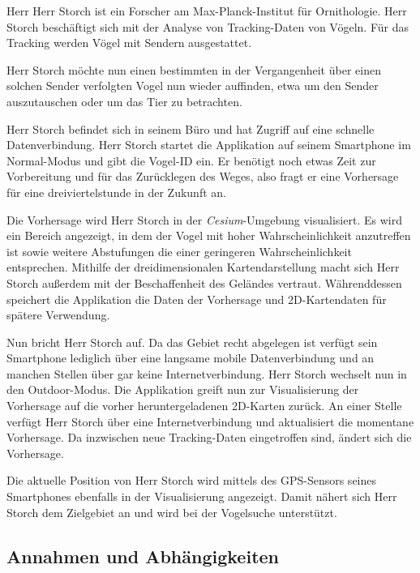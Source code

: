 \documentclass[12pt]{article} %
\begin{document}
\begin{displayquote}
\small
Herr Herr Storch ist ein Forscher am Max-Planck-Institut für Ornithologie. Herr Storch beschäftigt sich mit der Analyse von Tracking-Daten von Vögeln. Für das Tracking werden Vögel mit Sendern ausgestattet. 

Herr Storch möchte nun einen bestimmten in der Vergangenheit über einen solchen Sender verfolgten Vogel nun wieder auffinden, etwa um den Sender auszutauschen oder um das Tier zu betrachten.

Herr Storch befindet sich in seinem Büro und hat Zugriff auf eine schnelle Datenverbindung. Herr Storch startet die Applikation auf seinem Smartphone im Normal-Modus und gibt die Vogel-ID ein. Er benötigt noch etwas Zeit zur Vorbereitung und für das Zurücklegen des Weges, also fragt er eine Vorhersage für eine dreiviertelstunde in der Zukunft an.

Die Vorhersage wird Herr Storch in der \textit{Cesium}-Umgebung visualisiert. Es wird ein Bereich angezeigt, in dem der Vogel mit hoher Wahrscheinlichkeit anzutreffen ist sowie weitere Abstufungen die einer geringeren Wahrscheinlichkeit entsprechen. Mithilfe der dreidimensionalen Kartendarstellung macht sich Herr Storch außerdem mit der Beschaffenheit des Geländes vertraut. Währenddessen speichert die Applikation die Daten der Vorhersage und 2D-Kartendaten für spätere Verwendung.

Nun bricht Herr Storch auf. Da das Gebiet recht abgelegen ist verfügt sein Smartphone lediglich über eine langsame mobile Datenverbindung und an manchen Stellen über gar keine Internetverbindung. Herr Storch wechselt nun in den Outdoor-Modus. Die Applikation greift nun zur Visualisierung der Vorhersage auf die vorher heruntergeladenen 2D-Karten zurück. An einer Stelle verfügt Herr Storch über eine Internetverbindung und aktualisiert die momentane Vorhersage. Da inzwischen neue Tracking-Daten eingetroffen sind, ändert sich die Vorhersage.

Die aktuelle Position von Herr Storch wird mittels des GPS-Sensors seines Smartphones ebenfalls in der Visualisierung angezeigt. Damit nähert sich Herr Storch dem Zielgebiet an und wird bei der Vogelsuche unterstützt.
\end{displayquote}


\subsection{Annahmen und Abhängigkeiten}
\end{document}
